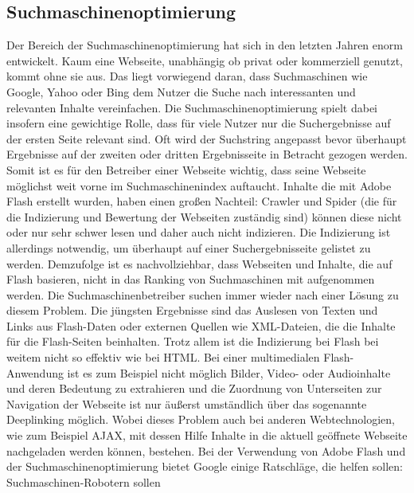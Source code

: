 
\subsection{Suchmaschinenoptimierung}
Der Bereich der Suchmaschinenoptimierung hat sich in den letzten Jahren
enorm entwickelt. Kaum eine Webseite, unabhängig ob privat oder kommerziell
genutzt, kommt ohne sie aus. Das liegt vorwiegend daran, dass Suchmaschinen
wie Google, Yahoo oder Bing dem Nutzer die Suche nach interessanten und
relevanten Inhalte vereinfachen. Die Suchmaschinenoptimierung spielt dabei
insofern eine gewichtige Rolle, dass für viele Nutzer nur die Suchergebnisse
auf der ersten Seite relevant sind. Oft wird der Suchstring angepasst bevor
überhaupt Ergebnisse auf der zweiten oder dritten Ergebnisseite in Betracht
gezogen werden. Somit ist es für den Betreiber einer Webseite wichtig, dass
seine Webseite möglichst weit vorne im Suchmaschinenindex auftaucht.
\newline\newline
Inhalte die mit Adobe Flash erstellt wurden, haben einen großen
Nachteil: Crawler und Spider (die für die Indizierung und Bewertung der
Webseiten zuständig sind) können diese nicht oder nur sehr schwer lesen und
daher auch nicht indizieren. Die Indizierung ist allerdings notwendig, um
überhaupt auf einer Suchergebnisseite gelistet zu werden. Demzufolge ist es
nachvollziehbar, dass Webseiten und Inhalte, die auf Flash basieren, nicht in
das Ranking von Suchmaschinen mit aufgenommen werden. Die
Suchmaschinenbetreiber suchen immer wieder nach einer Lösung zu diesem
Problem. Die jüngsten Ergebnisse sind das Auslesen von Texten und Links aus
Flash-Daten oder externen Quellen wie XML-Dateien, die die Inhalte für die
Flash-Seiten beinhalten. Trotz allem ist die Indizierung bei Flash bei weitem
nicht so effektiv wie bei HTML. Bei einer multimedialen Flash-Anwendung ist
es zum Beispiel nicht möglich Bilder, Video- oder Audioinhalte und deren
Bedeutung zu extrahieren und die Zuordnung von Unterseiten zur Navigation der
Webseite ist nur äußerst umständlich über das sogenannte Deeplinking möglich.
Wobei dieses Problem auch bei anderen Webtechnologien, wie zum Beispiel AJAX,
mit dessen Hilfe Inhalte in die aktuell geöffnete Webseite nachgeladen werden
können, bestehen.
\newline\newline
Bei der Verwendung von Adobe Flash und der Suchmaschinenoptimierung bietet
Google einige Ratschläge, die helfen sollen: Suchmaschinen-Robotern sollen
